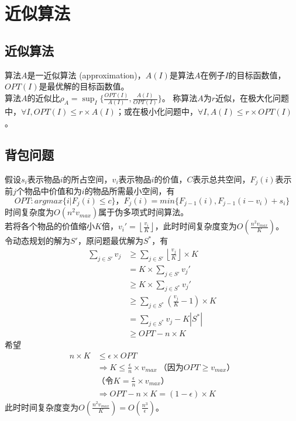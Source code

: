 \section{近似算法}
\subsection{近似算法}
算法$A$是一近似算法 (approximation)，$A(I)$是算法$A$在例子$I$的目标函数值，$OPT(I)$是最优解的目标函数值。 \\
算法$A$的近似比$\rho_A = \sup_{I}\{\frac{OPT(I)}{A(I)}, \frac{A(I)}{OPT(I)}\}$。
称算法$A$为$r$近似，在极大化问题中，$\forall I, OPT(I) \le r \times A(I)$；或在极小化问题中，$\forall I, A(I) \le r \times OPT(I)$。

\subsection{背包问题}
假设$s_i$表示物品$i$的所占空间，$v_i$表示物品$i$的价值，$C$表示总共空间，$F_j(i)$表示前$j$个物品中价值和为$i$的物品所需最小空间，有
$$
OPT: argmax \{i | F_j(i) \le c\}，F_j(i) = min\{F_{j - 1}(i), F_{j - 1}(i - v_i) + s_i\}
$$
时间复杂度为$O(n^2v_{max})$属于伪多项式时间算法。 \\
若将各个物品的价值缩小$K$倍，$v_i' =  \left\lfloor\frac{v_i}{K}\right\rfloor $，此时时间复杂度变为$O(\frac{n^2v_{max}}{K})$。 \\
令动态规划的解为$S'$，原问题最优解为$S^*$，有
\begin{align}
    \sum_{j \in S'}v_j & \ge \sum_{j \in S'}\left\lfloor\frac{v_j}{K}\right\rfloor \times K \nonumber \\
    & = K \times \sum_{j \in S'}v_j' \nonumber \\
    & \ge K \times \sum_{j \in S^*}v_j'\nonumber \\
    & \ge \sum_{j \in S^*}(\frac{v_j}{K} - 1) \times K \nonumber \\
    & = \sum_{j \in S^*}v_j - K|S^*| \nonumber \\
    & \ge OPT - n \times K \nonumber
\end{align}
希望
\begin{align}
    n \times K &\le \epsilon \times OPT \nonumber \\ 
    & \Rightarrow K \le \frac{\epsilon}{n} \times v_{max} \ \mbox{（因为}OPT \ge v_{max}\mbox{）} \nonumber \\
    & \mbox{（令} K = \frac{\epsilon}{n} \times v_{max} \mbox{）} \nonumber \\
    & \Rightarrow OPT - n \times K = (1 - \epsilon) \times K \nonumber
\end{align}
此时时间复杂度变为$O(\frac{n^2v_{max}}{K}) = O(\frac{n^3}{\epsilon})$。

